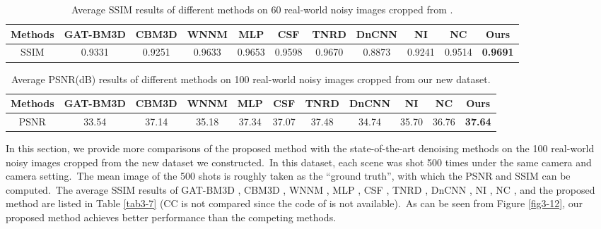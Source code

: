 \begin{table}[t!]
\begin{adjustwidth}{-.2cm}{}
\scriptsize
\caption{Average SSIM \cite{ssim} results of different methods on 60 real-world noisy images cropped from \cite{crosschannel2016}.}
\label{tab3-5}
\begin{center}
\renewcommand\arraystretch{1}
\begin{tabular}{|c||c|c|c|c|c|c|c|c|c|c|}
\hline
Methods
&\textbf{GAT-BM3D}
&\textbf{CBM3D}
&\textbf{WNNM}
&\textbf{MLP}
&\textbf{CSF} 
&\textbf{TNRD} 
&\textbf{DnCNN}
&\textbf{NI} 
&\textbf{NC} 
&\textbf{Ours} 
\\
\hline
SSIM  
& 0.9331 & 0.9251 & 0.9633 & 0.9653 & 0.9598 & 0.9670 & 0.8873 & 0.9241 & 0.9514 & \textbf{0.9691}
\\
\hline
\end{tabular}
\end{center}
\end{adjustwidth}\vspace{-4mm}
\end{table}




\begin{table}[t!]
\begin{adjustwidth}{-.2cm}{}
\scriptsize
\caption{Average PSNR(dB) results of different methods on 100 real-world noisy images cropped from our new dataset.}

\label{tab3-6}
\begin{center}
\renewcommand\arraystretch{1}
\begin{tabular}{|c||c|c|c|c|c|c|c|c|c|c|}
\hline
Methods
&\textbf{GAT-BM3D}
&\textbf{CBM3D}
&\textbf{WNNM}
&\textbf{MLP}
&\textbf{CSF} 
&\textbf{TNRD} 
&\textbf{DnCNN}
&\textbf{NI} 
&\textbf{NC} 
&\textbf{Ours} 
\\
\hline
PSNR  
& 33.54 & 37.14 & 35.18 & 37.34 & 37.07 & 37.48 & 34.74 & 35.70 & 36.76 & \textbf{37.64}
\\
\hline
\end{tabular}
\end{center}
\end{adjustwidth}\vspace{-4mm}
\end{table}

In this section, we provide more comparisons of the proposed method with the state-of-the-art denoising methods on the 100 real-world noisy images cropped from the new dataset we constructed.\ In this dataset, each scene was shot 500 times under the same camera and camera setting.\ The mean image of the 500 shots is roughly taken as the ``ground truth'', with which the PSNR and SSIM can be computed.\ The average  SSIM results of GAT-BM3D \cite{makitalo2013optimal}, CBM3D \cite{bm3d}, WNNM \cite{wnnm}, MLP \cite{mlp}, CSF \cite{csf}, TNRD \cite{tnrd}, DnCNN \cite{dncnn}, NI \cite{neatimage}, NC \cite{noiseclinic,ncwebsite}, and the proposed method are listed in Table \ref{tab3-7} (CC is not compared since the code of \cite{crosschannel2016} is not available).\ As can be seen from Figure \ref{fig3-12}, our proposed method achieves better performance than the competing methods.


